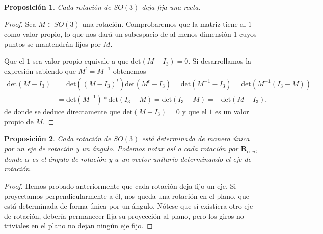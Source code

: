 \documentclass{article}
\theoremstyle{plain}
\newtheorem{proposition}{Proposición}
\theoremstyle{definition}
\theoremstyle{remark}
\begin{document}
\begin{proposition}
  Cada rotación de $SO(3)$ deja fija una recta.
\end{proposition}
\begin{proof}
  Sea $ M \in SO(3)$ una rotación. Comprobaremos que la matriz tiene
  al $1$ como valor propio, lo que nos dará un subespacio de al menos
  dimensión 1 cuyos puntos se mantendrán fijos por $M$.

  Que el $1$ sea valor propio equivale a que $\mathrm{det}(M-I_3)=0$.
  Si desarrollamos la expresión sabiendo que $M^t = M^{-1}$ obtenemos
  \[\begin{aligned}
    \mathrm{det}(M - I_3) &=
    \mathrm{det}((M - I_3)^t) \mathrm{det}(M^t - I_3) =
    \mathrm{det}(M^{-1} - I_3) =
    \mathrm{det}(M^{-1}(I_3 - M)) =\\
    &= \mathrm{det}(M^{-1}) * \mathrm{det}(I_3 - M) =
    \mathrm{det}(I_3 - M) = -\mathrm{det}(M - I_3),
  \end{aligned}\]
  de donde se deduce directamente que $\mathrm{det}(M - I_3) = 0$ y que el $1$
  es un valor propio de $M$.
\end{proof}

\begin{proposition}
  Cada rotación de $SO(3)$ está determinada de manera única por un
  eje de rotación y un ángulo. Podemos notar así a cada rotación por
  $\mathbf{R}_{\alpha,u}$, donde $\alpha$ es el ángulo de rotación y $u$
  un vector unitario determinando el eje de rotación.
\end{proposition}
\begin{proof}
  Hemos probado anteriormente que cada rotación deja fijo un eje. Si
  proyectamos perpendicularmente a él, nos queda una rotación en el
  plano, que está determinada de forma única por un ángulo. Nótese que
  si existiera otro eje de rotación, debería permanecer fija su
  proyección al plano, pero los giros no triviales en el plano no
  dejan ningún eje fijo.
\end{proof}
\end{document}
